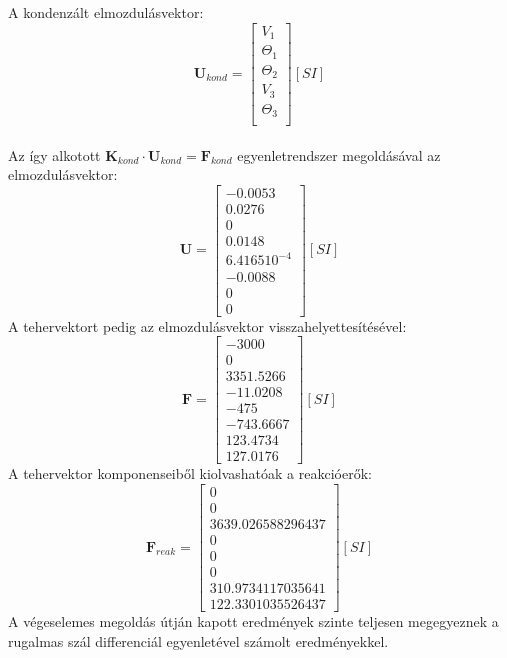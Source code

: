 \documentclass{article}
\begin{document}
		A kondenzált elmozdulásvektor:
		\begin{equation}
			\textbf{U}_{kond}=
			\begin{bmatrix}
			V_{1}    \\
			\Theta_{1} \\
			\Theta_{2} \\
			V_{3}    \\
			\Theta_{3} \\
			\end{bmatrix} [SI]
		\end{equation}\\[10pt]
		Az így alkotott $\textbf{K}_{kond}\cdot\textbf{U}_{kond}=\textbf{F}_{kond}$ egyenletrendszer megoldásával az elmozdulásvektor:
		\begin{equation}
			\textbf{U}=
			\begin{bmatrix}-0.0053\\
			0.0276\\
			0\\
			0.0148\\
			6.4165 {{10}^{-4}}\\
			-0.0088\\
			0\\
			0
			\end{bmatrix} [SI]
		\end{equation}
		A tehervektort pedig az elmozdulásvektor visszahelyettesítésével:
		\begin{equation}
			\textbf{F}=
			\begin{bmatrix}-3000\\
			0\\
			3351.5266\\
			-11.0208\\
			-475\\
			-743.6667\\
			123.4734\\
			127.0176
			\end{bmatrix} [SI]
		\end{equation}
		A tehervektor komponenseiből kiolvashatóak a reakcióerők:
		\begin{equation}
			\textbf{F}_{reak}=
			\begin{bmatrix}
			0\\
			0\\
			3639.026588296437\\
			0\\
			0\\
			0\\
			310.9734117035641\\
			122.3301035526437
			\end{bmatrix} [SI]
		\end{equation}
		A végeselemes megoldás útján kapott eredmények szinte teljesen megegyeznek a rugalmas szál differenciál egyenletével számolt eredményekkel.
\end{document}
